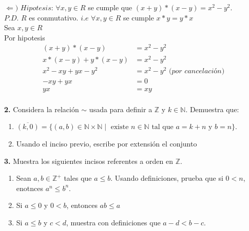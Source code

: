\documentclass[12pt]{article}
\begin{document}
$\Longleftarrow)$ $Hipotesis$:  $\forall x, y \in R$ se cumple que $(x + y) \ast (x - y) = x^2 - y^2$.\\

$P.D$. $R$ es conmutativo. $i.e$ $\forall x, y \in R$ se cumple $x \ast y = y \ast x$\\

Sea $x, y \in R$\\

Por hipotesis
\begin{align*}
                (x + y) \ast (x - y) &= x^2 - y^2\\
                x \ast (x -y) + y \ast (x -y) &= x^2 - y^2\\
                x^2 -xy + yx -y^2 &= x^2 - y^2 \textit{ (por cancelación)}\\
                -xy + yx &= 0\\
                yx &= xy\\
              \end{align*}
\vspace{1cm}

%
%
\textbf{2.} Considera la relación $\sim$ usada para definir a $\mathbb{Z}$ y $k \in \mathbb{N}$. Demuestra que:
    \begin{enumerate}[label=\alph*)]
        \item $\overline{(k, 0)} = \{(a, b) \in \mathbb{N} \times \mathbb{N} \mid \text{ existe } n \in \mathbb{N} \text{ tal que } a = k + n \text{ y } b = n\}$.

        \item Usando el inciso previo, escribe por extensión el conjunto 

    \end{enumerate}
\vspace{1cm}

%
%
\textbf{3.} Muestra los siguientes incisos referentes a orden en $\mathbb{Z}$.
    \begin{enumerate}[label=\alph*)]
        \item Sean $a, b \in \mathbb{Z}^+$ tales que $a \leq b$. Usando definiciones, prueba que si $0 < n$, enotnces $a^n \leq b^n$. 

        \item Si $ a \leq 0$ y $0 < b$, entonces $ab \leq a$

        \item Si $a \leq b$ y $c < d$, muestra con definiciones que $a - d < b - c$.

    \end{enumerate}
\vspace{1cm}
\end{document}
